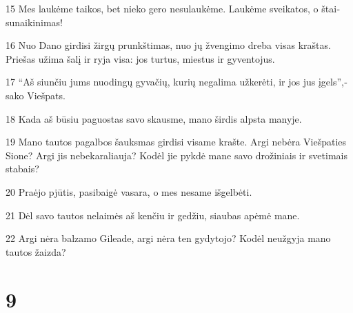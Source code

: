 \par 15 Mes laukėme taikos, bet nieko gero nesulaukėme. Laukėme sveikatos, o štai­sunaikinimas! 
\par 16 Nuo Dano girdisi žirgų prunkštimas, nuo jų žvengimo dreba visas kraštas. Priešas užima šalį ir ryja visa: jos turtus, miestus ir gyventojus. 
\par 17 “Aš siunčiu jums nuodingų gyvačių, kurių negalima užkerėti, ir jos jus įgels”,­sako Viešpats. 
\par 18 Kada aš būsiu paguostas savo skausme, mano širdis alpsta manyje. 
\par 19 Mano tautos pagalbos šauksmas girdisi visame krašte. Argi nebėra Viešpaties Sione? Argi jis nebekaraliauja? Kodėl jie pykdė mane savo drožiniais ir svetimais stabais? 
\par 20 Praėjo pjūtis, pasibaigė vasara, o mes nesame išgelbėti. 
\par 21 Dėl savo tautos nelaimės aš kenčiu ir gedžiu, siaubas apėmė mane. 
\par 22 Argi nėra balzamo Gileade, argi nėra ten gydytojo? Kodėl neužgyja mano tautos žaizda?



\chapter{9}


